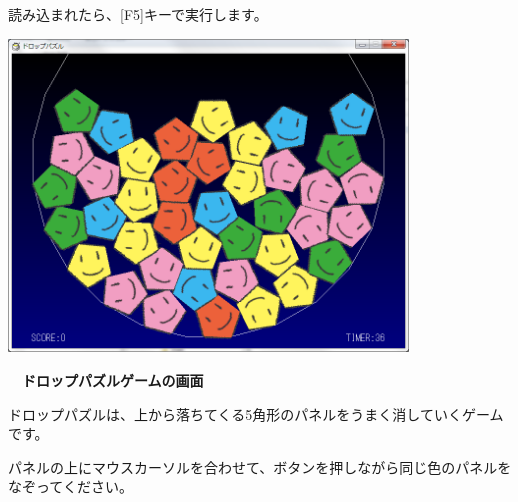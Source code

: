 \documentclass[a4paper,dvipdfmx]{jarticle}
\newcommand\textstyleqwerty[1]{#1}
\begin{document}
\bigskip

読み込まれたら、[F5]キーで実行します。


\bigskip



\begin{center}
\includegraphics[width=10.605cm,height=8.306cm]{text02-img/text02-img015.png}

\end{center}

\bigskip


\bigskip


\bigskip


\bigskip


\bigskip


\bigskip


\bigskip


\bigskip


\bigskip


\bigskip


\bigskip


\bigskip


\bigskip


\bigskip


\bigskip


\bigskip

\textstyleqwerty{\textbf{　ドロップパズルゲームの画面}}


\bigskip


\bigskip


\bigskip


\bigskip

ドロップパズルは、上から落ちてくる5角形のパネルをうまく消していくゲームです。

パネルの上にマウスカーソルを合わせて、ボタンを押しながら同じ色のパネルをなぞってください。
\end{document}
